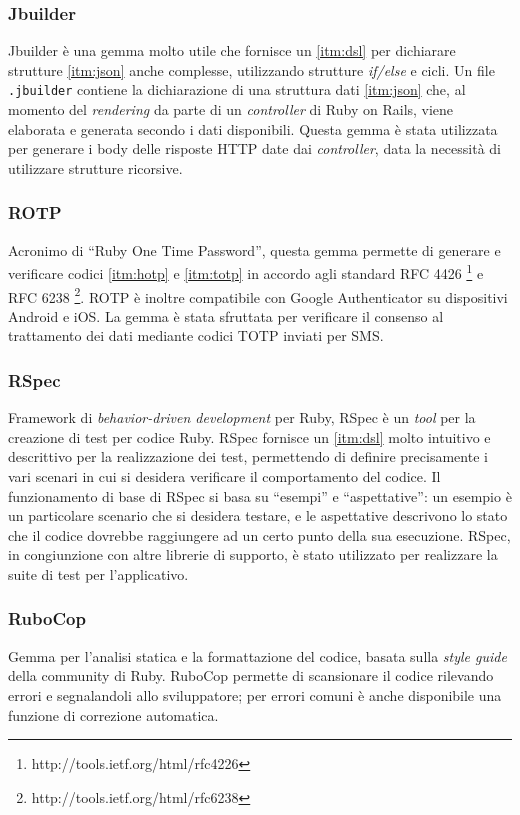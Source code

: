 \subsubsection{Jbuilder}
Jbuilder è una gemma molto utile che fornisce un \ref{itm:dsl} per dichiarare strutture \ref{itm:json} anche complesse, utilizzando strutture \textit{if/else} e cicli. Un file \texttt{.jbuilder} contiene la dichiarazione di una struttura dati \ref{itm:json} che, al momento del \textit{rendering} da parte di un \textit{controller} di Ruby on Rails, viene elaborata e generata secondo i dati disponibili. Questa gemma è stata utilizzata per generare i body delle risposte HTTP date dai \textit{controller}, data la necessità di utilizzare strutture ricorsive.

\subsubsection{ROTP}
Acronimo di ``Ruby One Time Password'', questa gemma permette di generare e verificare codici \ref{itm:hotp} e \ref{itm:totp} in accordo agli standard RFC 4426 \footnote[1]{http://tools.ietf.org/html/rfc4226} e RFC 6238 \footnote[2]{http://tools.ietf.org/html/rfc6238}. ROTP è inoltre compatibile con Google Authenticator su dispositivi Android e iOS. La gemma è stata sfruttata per verificare il consenso al trattamento dei dati mediante codici TOTP inviati per SMS.

\subsubsection{RSpec}
Framework di \textit{behavior-driven development} per Ruby, RSpec è un \textit{tool} per la creazione di test per codice Ruby. RSpec fornisce un \ref{itm:dsl} molto intuitivo e descrittivo per la realizzazione dei test, permettendo di definire precisamente i vari scenari in cui si desidera verificare il comportamento del codice. Il funzionamento di base di RSpec si basa su ``esempi'' e ``aspettative'': un esempio è un particolare scenario che si desidera testare, e le aspettative descrivono lo stato che il codice dovrebbe raggiungere ad un certo punto della sua esecuzione.
RSpec, in congiunzione con altre librerie di supporto, è stato utilizzato per realizzare la suite di test per l'applicativo.

\subsubsection{RuboCop}
Gemma per l'analisi statica e la formattazione del codice, basata sulla \textit{style guide} della community di Ruby. RuboCop permette di scansionare il codice rilevando errori e segnalandoli allo sviluppatore; per errori comuni è anche disponibile una funzione di correzione automatica.

